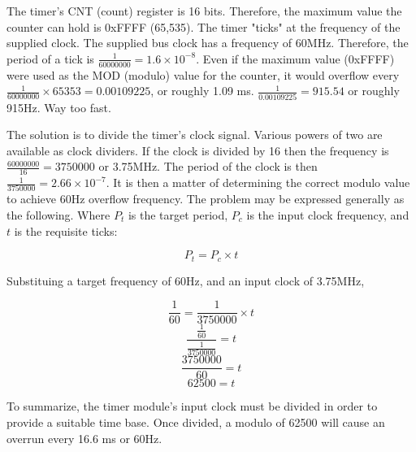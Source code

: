 \documentclass[12pt,a4paper]{article}
\begin{document}
The timer's CNT (count) register is 16 bits.
Therefore, the maximum value the counter can hold is 0xFFFF (65,535).
The timer "ticks" at the frequency of the supplied clock.
The supplied bus clock has a frequency of 60MHz.
Therefore, the period of a tick is \(\frac{1}{60000000} = 1.6 \times 10^{-8}\).
Even if the maximum value (0xFFFF) were used as the MOD (modulo) value for the counter,
it would overflow every \(\frac{1}{60000000} \times 65353 = 0.00109225\),
or roughly 1.09 ms. \(\frac{1}{0.00109225} = 915.54\) or roughly 915Hz. Way too fast.

The solution is to divide the timer's clock signal.
Various powers of two are available as clock dividers.
If the clock is divided by 16 then the frequency is \(\frac{60000000}{16} = 3750000\)
or 3.75MHz.
The period of the clock is then \(\frac{1}{3750000} = 2.66 \times 10^{-7}\).
It is then a matter of determining the correct modulo value to achieve 60Hz overflow frequency.
The problem may be expressed generally as the following.
Where \(P_t\) is the target period, \(P_c\) is the input clock frequency, and \(t\) is the requisite ticks:

\[P_t = P_c \times t \]

Substituing a target frequency of 60Hz, and an input clock of 3.75MHz,

\[ \frac{1}{60} = \frac{1}{3750000} \times t\]
\[ \frac{\frac{1}{60}}{\frac{1}{3750000}} = t\]
\[ \frac{3750000}{60} = t \]
\[ 62500 = t \]

To summarize, the timer module's input clock must be divided in order to provide a suitable time base.
Once divided, a modulo of 62500 will cause an overrun every 16.6 ms or 60Hz.
\end{document}
